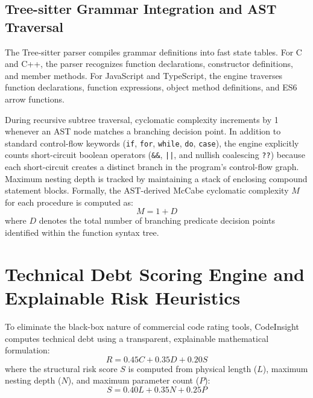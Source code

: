 \subsection{Tree-sitter Grammar Integration and AST Traversal}
The Tree-sitter parser compiles grammar definitions into fast state tables. For C and C++, the parser recognizes function declarations, constructor definitions, and member methods. For JavaScript and TypeScript, the engine traverses function declarations, function expressions, object method definitions, and ES6 arrow functions.

During recursive subtree traversal, cyclomatic complexity increments by 1 whenever an AST node matches a branching decision point. In addition to standard control-flow keywords (\texttt{if}, \texttt{for}, \texttt{while}, \texttt{do}, \texttt{case}), the engine explicitly counts short-circuit boolean operators (\texttt{\&\&}, \texttt{||}, and nullish coalescing \texttt{??}) because each short-circuit creates a distinct branch in the program's control-flow graph. Maximum nesting depth is tracked by maintaining a stack of enclosing compound statement blocks. Formally, the AST-derived McCabe cyclomatic complexity $M$ for each procedure is computed as:
\begin{equation}
\label{eq:mccabe_ast}
\boxed{M = 1 + D}
\end{equation}
where $D$ denotes the total number of branching predicate decision points identified within the function syntax tree.

\section{Technical Debt Scoring Engine and Explainable Risk Heuristics}
To eliminate the black-box nature of commercial code rating tools, CodeInsight computes technical debt using a transparent, explainable mathematical formulation:
\begin{equation}
\label{eq:unified_risk}
\boxed{R = 0.45C + 0.35D + 0.20S}
\end{equation}
where the structural risk score $S$ is computed from physical length ($L$), maximum nesting depth ($N$), and maximum parameter count ($P$):
\begin{equation}
\label{eq:structural_risk}
\boxed{S = 0.40L + 0.35N + 0.25P}
\end{equation}

